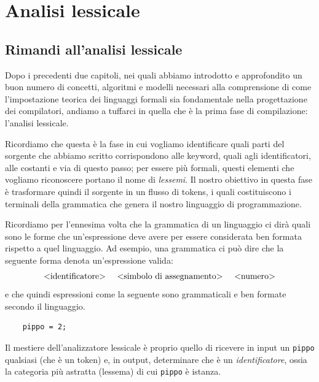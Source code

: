 \documentclass[class=book, crop=false, oneside, 12pt]{standalone}
\begin{document}
\chapter{Analisi lessicale}

\section{Rimandi all'analisi lessicale}
Dopo i precedenti due capitoli, nei quali abbiamo introdotto e approfondito un buon numero di concetti, algoritmi e modelli necessari alla comprensione di come l'impostazione teorica dei linguaggi formali sia fondamentale nella progettazione dei compilatori, andiamo a tuffarci in quella che è la prima fase di compilazione: l'analisi lessicale.


Ricordiamo che questa è la fase in cui vogliamo identificare quali parti del sorgente che abbiamo scritto corrispondono alle keyword, quali agli identificatori, alle costanti e via di questo passo; per essere più formali, questi elementi che vogliamo riconoscere portano il nome di \emph{lessemi}. 
Il nostro obiettivo in questa fase è trasformare quindi il sorgente in un flusso di tokens, i quali costituiscono i terminali della grammatica che genera il nostro linguaggio di programmazione.

Ricordiamo per l'ennesima volta che la grammatica di un linguaggio ci dirà quali sono le forme che un'espressione deve avere per essere considerata ben formata rispetto a quel linguaggio. Ad esempio, una grammatica ci può dire che la seguente forma denota un'espressione valida:
\begin{equation*}
    \textrm{<identificatore> \quad <simbolo di assegnamento> \quad <numero>}
\end{equation*}
e che quindi espressioni come la seguente sono grammaticali e ben formate secondo il linguaggio.\\
\begin{verbatim}
    pippo = 2;
\end{verbatim}
Il mestiere dell'analizzatore lessicale è proprio quello di ricevere in input un \texttt{pippo} qualsiasi (che è un token) e, in output, determinare che è un \emph{identificatore}, ossia la categoria più astratta (lessema) di cui \texttt{pippo} è istanza.

\end{document}
